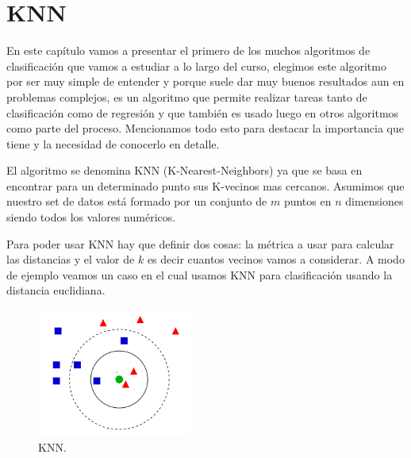 \chapter{KNN}

En este capítulo vamos a presentar el primero de los muchos algoritmos de clasificación que vamos a estudiar a lo largo del curso, elegimos este algoritmo por ser muy simple de entender y porque suele dar muy buenos resultados aun en problemas complejos, es un algoritmo que permite realizar tareas tanto de clasificación como de regresión y que también es usado luego en otros algoritmos como parte del proceso. Mencionamos todo esto para destacar la importancia que tiene y la necesidad de conocerlo en detalle. 

El algoritmo se denomina KNN (K-Nearest-Neighbors) ya que se basa en encontrar para un determinado punto sus K-vecinos mas cercanos. Asumimos que nuestro set de datos está formado por un conjunto de $m$ puntos en $n$ dimensiones siendo todos los valores numéricos. 

Para poder usar KNN hay que definir dos cosas: la métrica a usar para calcular las distancias y el valor de $k$ es decir cuantos vecinos vamos a considerar. A modo de ejemplo veamos un caso en el cual usamos KNN para clasificación usando la distancia euclidiana.

\begin{figure}[!htb]
\centering
\includegraphics[width=2in]{figures/knn-fig-1.png}
\caption{KNN.}
\label{fig10}
\end{figure}

\begin{table}[!hbt]
\vskip 0.25cm
\caption{Ejemplo KNN.}
\end{table}

